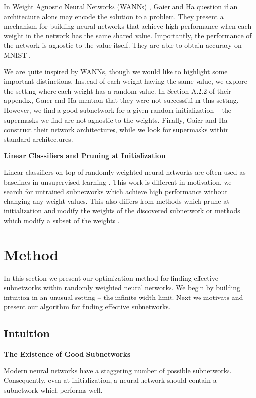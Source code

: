 \documentclass[10pt,twocolumn,letterpaper]{article}
\begin{document}
In Weight Agnostic Neural Networks (WANNs) \cite{wann2019}, Gaier and Ha question if an architecture alone may encode the solution to a problem. They present a mechanism for building neural networks that achieve high performance when each weight in the network has the same shared value. Importantly, the performance of the network is agnostic to the value itself. They are able to obtain  accuracy on MNIST \cite{mnist}.

We are quite inspired by WANNs, though we would like to highlight some important distinctions. Instead of each weight having the same value, we explore the setting where each weight has a random value. In Section A.2.2 of their appendix, Gaier and Ha mention that they were not successful in this setting. However, we find a good subnetwork for a given random initialization -- the supermasks we find are not agnostic to the weights. Finally, Gaier and Ha construct their network architectures, while we look for supermasks within standard architectures.

\noindent\textbf{Linear Classifiers and Pruning at Initialization}

Linear classifiers on top of randomly weighted neural networks are often used as baselines in unsupervised learning \cite{jigsaw, elm}. This work is different in motivation, we search for untrained subnetworks which achieve high performance without changing any weight values. This also differs from methods which prune at initialization and modify the weights of the discovered subnetwork \cite{lee2018snip, lee2019signal} or methods which modify a subset of the weights \cite{rosenfeld2019intriguing}.

\section{Method}

In this section we present our optimization method for finding effective subnetworks within randomly weighted neural networks. We begin by building intuition in an unusual setting -- the infinite width limit. Next we motivate and present our algorithm for finding effective subnetworks.

\subsection{Intuition} \label{sec:int}

\noindent \textbf{The Existence of Good Subnetworks} 

Modern neural networks have a staggering number of possible subnetworks. Consequently, even at initialization, a neural network should contain a subnetwork which performs well. 
\end{document}
